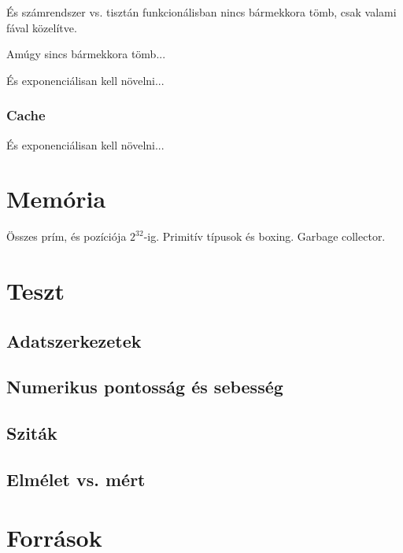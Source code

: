 \documentclass[12pt]{report}
\begin{document}
És számrendszer vs. tisztán funkcionálisban nincs bármekkora tömb, csak valami fával közelítve.

Amúgy sincs bármekkora tömb...

És exponenciálisan kell növelni...

\subsubsection{Cache}

És exponenciálisan kell növelni...

\section{Memória}

Összes prím, és pozíciója $2^32$-ig. Primitív típusok és boxing. Garbage collector.

\section{Teszt}

\subsection{Adatszerkezetek}

\subsection{Numerikus pontosság és sebesség}

\subsection{Sziták}

\subsection{Elmélet vs. mért}

\section{Források}
\end{document}
